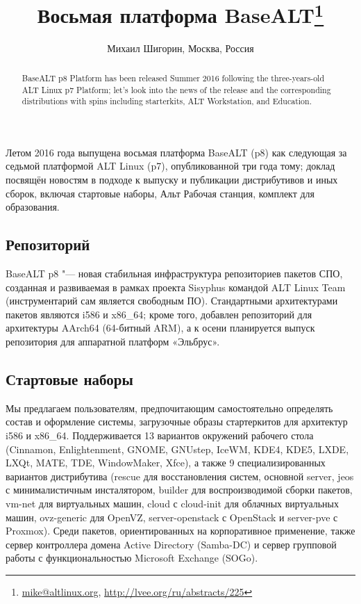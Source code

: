 \documentclass[10pt, a5paper]{article}
\begin{document}
\title{Восьмая платформа BaseALT\footnote{\url{mike@altlinux.org}, \url{http://lvee.org/ru/abstracts/225}}}
\author{Михаил Шигорин, Москва, Россия}
\maketitle
\begin{abstract}
BaseALT p8 Platform has been released Summer 2016 following the three-years-old ALT Linux p7 Platform; let's look into the news of the release and the corresponding distributions with spins including starterkits, ALT Workstation, and Education.
\end{abstract}
Летом 2016 года выпущена восьмая платформа BaseALT (p8) как следующая за седьмой платформой ALT Linux (p7), опубликованной три года тому; доклад посвящён новостям в подходе к выпуску и публикации дистрибутивов и иных сборок, включая стартовые наборы, Альт Рабочая станция, комплект для образования.

\subsection*{Репозиторий}

BaseALT p8 "--- новая стабильная инфраструктура репозиториев пакетов СПО, созданная и развиваемая в рамках проекта Sisyphus командой ALT Linux Team (инструментарий сам является свободным ПО).
Стандартными архитектурами пакетов являются i586 и x86\_64; кроме того, добавлен репозиторий для архитектуры \linebreak AArch64 (64-битный ARM), а к осени планируется выпуск репозитория для аппаратной платформ «Эльбрус».

\subsection*{Стартовые наборы}

Мы предлагаем пользователям, предпочитающим самостоятельно определять состав и оформление системы, загрузочные образы стартеркитов для архитектур i586 и x86\_64. Поддерживается 13 вариантов окружений рабочего стола (Cinnamon, Enlightenment, GNOME, GNUstep, IceWM, KDE4, KDE5, LXDE, LXQt, MATE, TDE, WindowMaker, Xfce), а также 9 специализированных вариантов дистрибутива (rescue для восстановления систем, основной server, jeos с минималистичным инсталятором, builder для воспроизводимой сборки пакетов, vm-net для виртуальных машин, cloud с cloud-init для облачных виртуальных машин, ovz-generic для \linebreak OpenVZ, server-openstack с OpenStack и server-pve с Proxmox). Среди пакетов, ориентированных на корпоративное применение, также сервер контроллера домена Active Directory (Samba-DC) и сервер групповой работы с функциональностью Microsoft Exchange (SOGo).
\end{document}
